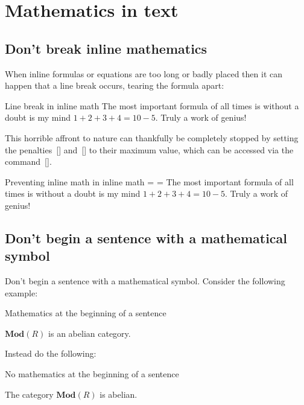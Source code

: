 \section{Mathematics in text}



\subsection{Don’t break inline mathematics}
\label{breaking inline math}

When inline formulas or equations are too long or badly placed then it can happen that a line break occurs, tearing the formula apart:
\begin{showlatex}[before lower = {\binoppenalty=100}, after lower = {\binoppenalty = \maxdimen}]{Line break in inline math}
The most important formula of all times is without a doubt is my mind $1 + 2 + 3 + 4 = 10 - 5$.
Truly a work of genius!
\end{showlatex}
This horrible affront to nature can thankfully be completely stopped by setting the penalties~[\comname] and~[\comname] to their maximum value, which can be accessed via the command~[\comname].
\begin{showlatex}{Preventing inline math in inline math}
\binoppenalty = \maxdimen
\relpenalty = \maxdimen
The most important formula of all times is without a doubt is my mind $1 + 2 + 3 + 4 = 10 - 5$.
Truly a work of genius!
\end{showlatex}



\subsection{Don’t begin a sentence with a mathematical symbol}

Don’t begin a sentence with a mathematical symbol.
Consider the following example:
\begin{showlatex}{Mathematics at the beginning of a sentence}
\begin{theorem}
  $\mathbf{Mod}(R)$ is an abelian category.
\end{theorem}
\end{showlatex}
Instead do the following:
\begin{showlatex}{No mathematics at the beginning of a sentence}
\begin{theorem}
  The category $\mathbf{Mod}(R)$ is abelian.
\end{theorem}
\end{showlatex}

